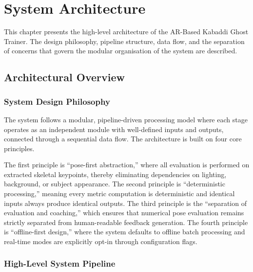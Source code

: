 \chapter{System Architecture}

This chapter presents the high-level architecture of the AR-Based Kabaddi Ghost Trainer. The design philosophy, pipeline structure, data flow, and the separation of concerns that govern the modular organisation of the system are described.


\section{Architectural Overview}

\subsection{System Design Philosophy}

The system follows a modular, pipeline-driven processing model where each stage operates as an independent module with well-defined inputs and outputs, connected through a sequential data flow. The architecture is built on four core principles.

The first principle is ``pose-first abstraction,'' where all evaluation is performed on extracted skeletal keypoints, thereby eliminating dependencies on lighting, background, or subject appearance. The second principle is ``deterministic processing,'' meaning every metric computation is deterministic and identical inputs always produce identical outputs. The third principle is the ``separation of evaluation and coaching,'' which ensures that numerical pose evaluation remains strictly separated from human-readable feedback generation. The fourth principle is ``offline-first design,'' where the system defaults to offline batch processing and real-time modes are explicitly opt-in through configuration flags.


\subsection{High-Level System Pipeline}

